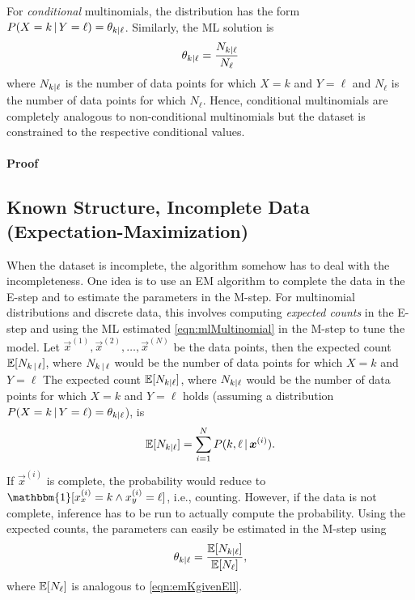 				For \emph{conditional} multinomials, the distribution has the form \( P(X = k \,\vert\, Y = \ell) = \theta_{k \vert \ell} \). Similarly, the ML solution is
				\begin{equation}
					\theta_{k \vert \ell} = \frac{N_{k \vert \ell}}{N_{\ell}}  \label{eqn:mlMultinomial}
				\end{equation}
				where \( N_{k \vert \ell} \) is the number of data points for which \( X = k \) and \( Y = \ell \) and \( N_{\ell} \) is the number of data points for which \( N_{\ell} \). Hence, conditional multinomials are completely analogous to non-conditional multinomials but the dataset is constrained to the respective conditional values.

				\paragraph{Proof}

		\subsection{Known Structure, Incomplete Data (Expectation-Maximization)}
			\label{subsec:em}

			When the dataset is incomplete, the algorithm somehow has to deal with the incompleteness. One idea is to use an EM algorithm to complete the data in the E-step and to estimate the parameters in the M-step. For multinomial distributions and discrete data, this involves computing \emph{expected counts} in the E-step and using the ML estimated \eqref{eqn:mlMultinomial} in the M-step to tune the model. Let \( \vec{x}^{(1)}, \vec{x}^{(2)}, \dots, \vec{x}^{(N)} \) be the data points, then the expected count \( \mathbb{E}[N_{k \,\vert\, \ell}] \), where \( N_{k \,\vert\, \ell} \) would be the number of data points for which \(X = k\) and \(Y = \ell\)
			The expected count \( \mathbb{E}[N_{k \vert \ell}] \), where \( N_{k \vert \ell} \) would be the number of data points for which \(X = k\) and \(Y = \ell\) holds (assuming a distribution \( P(X = k \,\vert\, Y = \ell) = \theta_{k \vert \ell} \)), is
			\begin{equation}
				\mathbb{E}[N_{k \vert \ell}] = \sum_{i = 1}^{N} P(k, \ell \,\vert\, \bm{x}^{(i)}).  \label{eqn:emKgivenEll}
			\end{equation}
			If \( \vec{x}^{(i)} \) is complete, the probability would reduce to \( \mathbbm{1}[x^{(i)}_x = k \land x^{(i)}_y = \ell] \), i.e., counting. However, if the data is not complete, inference has to be run to actually compute the probability. Using the expected counts, the parameters can easily be estimated in the M-step using
			\begin{equation}
				\theta_{k \vert \ell} = \frac{\mathbb{E}[N_{k \vert \ell}]}{\mathbb{E}[N_{\ell}]},
			\end{equation}
			where \( \mathbb{E}[N_{\ell}] \) is analogous to \eqref{eqn:emKgivenEll}.

